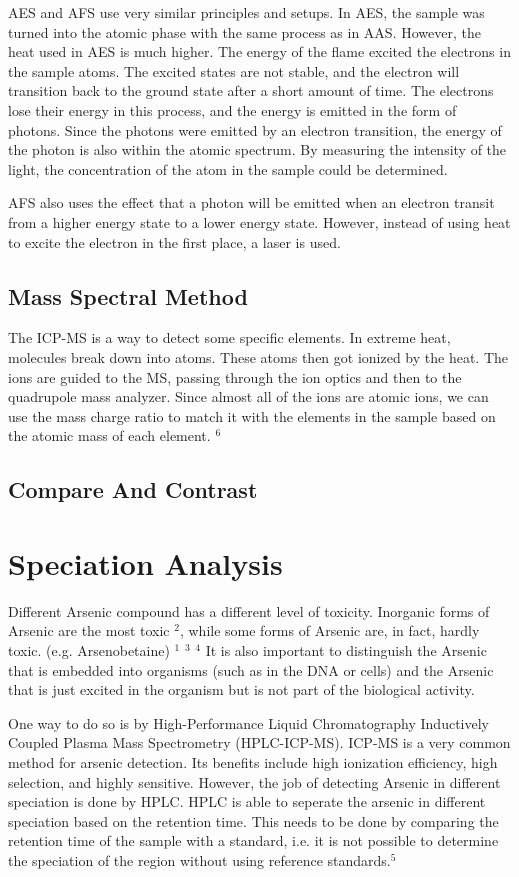 \documentclass[12pt]{article}
\begin{document}
AES and AFS use very similar principles and setups. In AES, the sample was turned into the atomic phase with the same process as in AAS. However, the heat used in AES is much higher. The energy of the flame excited the electrons in the sample atoms. The excited states are not stable, and the electron will transition back to the ground state after a short amount of time. The electrons lose their energy in this process, and the energy is emitted in the form of photons. Since the photons were emitted by an electron transition, the energy of the photon is also within the atomic spectrum. By measuring the intensity of the light, the concentration of the atom in the sample could be determined. 

AFS also uses the effect that a photon will be emitted when an electron transit from a higher energy state to a lower energy state. However, instead of using heat to excite the electron in the first place, a laser is used.

\subsection{Mass Spectral Method}
The ICP-MS is a way to detect some specific elements. In extreme heat, molecules break down into atoms. These atoms then got ionized by the heat. The ions are guided to the MS, passing through the ion optics and then to the quadrupole mass analyzer. Since almost all of the ions are atomic ions, we can use the mass charge ratio to match it with the elements in the sample based on the atomic %
mass of each element. $^6$ 

\subsection{Compare And Contrast}

\section{Speciation Analysis}
Different Arsenic compound has a different level of toxicity. Inorganic forms of Arsenic are the most toxic $^2$, while some forms of Arsenic are, in fact, hardly toxic. (e.g. Arsenobetaine) $^1$ $^3$ $^4$ It is also important to distinguish the Arsenic that is embedded into organisms (such as in the DNA or cells) and the Arsenic that is just excited in the organism but is not part of the biological activity. 

One way to do so is by High-Performance Liquid Chromatography Inductively Coupled Plasma Mass Spectrometry (HPLC-ICP-MS). ICP-MS is a very common method for arsenic detection. Its benefits include high ionization efficiency, high selection, and highly sensitive. However, the job of detecting Arsenic in different speciation is done by HPLC. HPLC is able to seperate the arsenic in different speciation based on the retention time. This needs to be done by comparing the retention time of the sample with a standard, i.e. it is not possible to determine the speciation of the region without using reference standards.$^5$  
\end{document}
